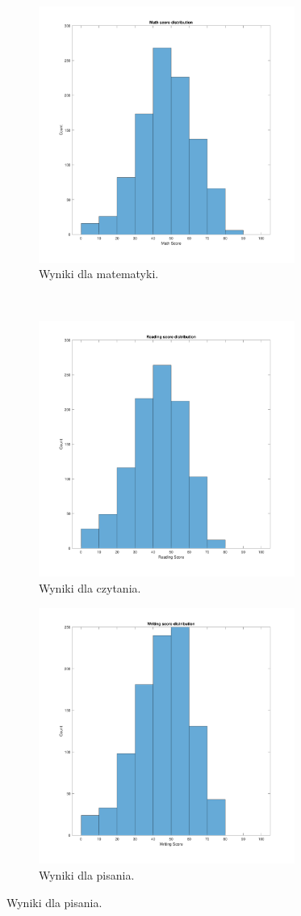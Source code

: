 \documentclass[12pt]{article}
\begin{document}
\begin{figure}[H]
\centering
\begin{subfigure}[t]{0.48\textwidth} 
\centering
\includegraphics[height=3.3in]{math_score_distribution.pdf}
\caption{Wyniki dla matematyki.}
\end{subfigure}
~~
\begin{subfigure}[t]{0.48\textwidth} 
\centering
\includegraphics[height=3.3in]{reading_score_distribution.pdf}
\caption{Wyniki dla czytania.}
\end{subfigure}

\begin{subfigure}[t]{0.48\textwidth} 
\centering
\includegraphics[height=3.3in]{writing_score_distribution.pdf}
\caption{Wyniki dla pisania.}
\end{subfigure}


\end{figure}
\end{document}
